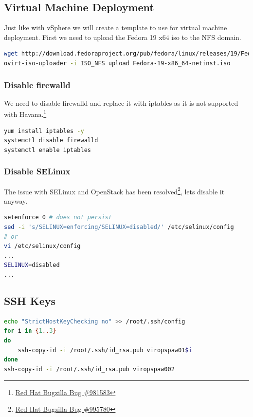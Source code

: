 \documentclass[11pt,letterpaper,oneside]{book}
\begin{document}
\subsection{Virtual Machine Deployment}
Just like with vSphere we will create a template to use for virtual machine deployment.  First we need to upload the Fedora 19 x64 iso to the NFS domain. 

\begin{lstlisting}[caption={Upload ISO},language=bash]
wget http://download.fedoraproject.org/pub/fedora/linux/releases/19/Fedora/x86_64/iso/Fedora-19-x86_64-netinst.iso
ovirt-iso-uploader -i ISO_NFS upload Fedora-19-x86_64-netinst.iso
\end{lstlisting}

\subsubsection{Disable firewalld} 
We need to disable firewalld and replace it with iptables as it is not supported with Havana.\footnote{\href{https://bugzilla.redhat.com/show_bug.cgi?id=981583}{Red Hat Bugzilla Bug \#981583}}
\begin{lstlisting}[caption={Disable firewalld, install iptables},language=bash]
yum install iptables -y
systemctl disable firewalld 
systemctl enable iptables 
\end{lstlisting}
\subsubsection{Disable SELinux}  
The issue with SELinux and OpenStack has been resolved\footnote{\href{https://bugzilla.redhat.com/show_bug.cgi?id=995780}{Red Hat Bugzilla Bug \#995780}}, lets disable it anyway.
\begin{lstlisting}[caption={Disable SELinux},language=bash]
setenforce 0 # does not persist 
sed -i 's/SELINUX=enforcing/SELINUX=disabled/' /etc/selinux/config
# or
vi /etc/selinux/config
...
SELINUX=disabled
...
\end{lstlisting}

\subsection{SSH Keys}
\begin{lstlisting}[caption={SSH Key Copy},language=bash]
echo "StrictHostKeyChecking no" >> /root/.ssh/config
for i in {1..3}
do
	ssh-copy-id -i /root/.ssh/id_rsa.pub viropspaw01$i
done
ssh-copy-id -i /root/.ssh/id_rsa.pub viropspaw002
\end{lstlisting}
\end{document}

